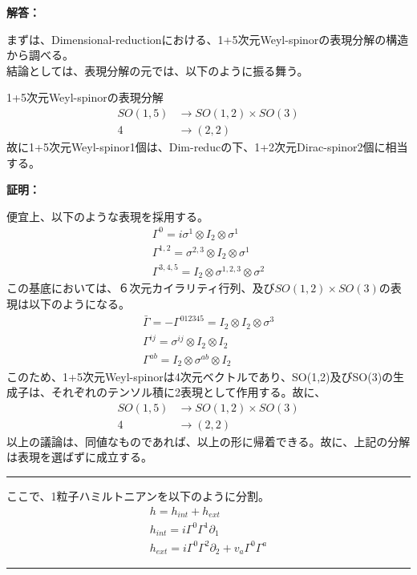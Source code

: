 \documentclass[dvipdfmx,a4paper,10.5pt]{article}
\numberwithin{equation}{section}
\newenvironment{proofbox}
{\begin{prooflabel}\textbf{証明：}\end{prooflabel}\vspace{0.8em}}
{\par\vspace{1em}\hrule\vspace{1em}}
\newenvironment{answerbox}
{\begin{prooflabel}\textbf{解答：}\end{prooflabel}\vspace{0.8em}}
{\par\vspace{1em}\hrule\vspace{1em}}
\begin{document}
\begin{answerbox}
    まずは、Dimensional-reductionにおける、1+5次元Weyl-spinorの表現分解の構造から調べる。\\
    結論としては、表現分解の元では、以下のように振る舞う。
    \begin{resultbox}{1+5次元Weyl-spinorの表現分解}
        \begin{align*}
            SO(1,5)&\to SO(1,2)\times SO(3)\\
            4 &\to (2,2)
        \end{align*}
    故に1+5次元Weyl-spinor1個は、Dim-reducの下、1+2次元Dirac-spinor2個に相当する。
    \end{resultbox}
    \begin{proofbox}
        便宜上、以下のような表現を採用する。
        \begin{gather*}
            \Gamma^{0}=i\sigma^{1}\otimes I_{2}\otimes \sigma^{1}\\
            \Gamma^{1,2}=\sigma^{2,3}\otimes I_{2}\otimes \sigma^{1}\\
            \Gamma^{3,4,5}=I_{2}\otimes \sigma^{1,2,3}\otimes \sigma^{2} 
        \end{gather*}
        この基底においては、６次元カイラリティ行列、及び$SO(1,2)\times SO(3)$の表現は以下のようになる。
        \begin{gather*}
            \bar{\Gamma}=-\Gamma^{012345}=I_{2}\otimes I_{2} \otimes \sigma^{3}\\
            \Gamma^{ij}=\sigma^{ij}\otimes I_{2}\otimes I_{2}\\
            \Gamma^{ab}=I_{2}\otimes \sigma^{ab} \otimes I_{2}
        \end{gather*}
        このため、1+5次元Weyl-spinorは4次元ベクトルであり、SO(1,2)及びSO(3)の生成子は、それぞれのテンソル積に2表現として作用する。故に、
     \begin{align*}
            SO(1,5)&\to SO(1,2)\times SO(3)\\
            4 &\to (2,2)
        \end{align*}
        以上の議論は、同値なものであれば、以上の形に帰着できる。故に、上記の分解は表現を選ばずに成立する。
    \end{proofbox}
    ここで、1粒子ハミルトニアンを以下のように分割。
    \begin{gather*}
        h=h_{int}+h_{ext}\\
        h_{int}=i\Gamma^{0}\Gamma^{1}\partial_{1}\\
        h_{ext}=i\Gamma^{0}\Gamma^{2}\partial_{2}+v_{a}\Gamma^{0}\Gamma^{a}

\end{gather*}
\end{answerbox}
\end{document}
